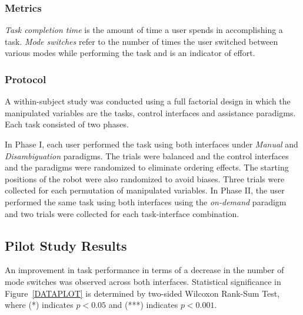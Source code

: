 \documentclass[conference]{IEEEtran}
\begin{document}
\subsubsection*{Metrics}
 \textit{Task completion time} is the amount of time a user spends in accomplishing a task. \textit{Mode switches} refer to the number of times the user switched between various modes while performing the task and is an indicator of effort. 

\subsubsection*{Protocol}
A within-subject study was conducted using a full factorial design in which the manipulated variables are the tasks, control interfaces and assistance paradigms. Each task consisted of two phases. 

In Phase I, each user performed the task using both interfaces under \textit{Manual} and \textit{Disambiguation} paradigms. The trials were balanced and the control interfaces and the paradigms were randomized to eliminate ordering effects. The starting positions of the robot were also randomized to avoid biases. Three trials were collected for each permutation of manipulated variables. 
In Phase II, the user performed the same task using both interfaces using the \textit{on-demand} paradigm and two trials were collected for each task-interface combination.  



\subsection{Pilot Study Results}\label{RES}
An improvement in task performance in terms of a decrease in the number of mode switches was observed across both interfaces. Statistical significance in Figure~\ref{DATAPLOT} is determined by two-sided Wilcoxon Rank-Sum Test, where (*) indicates $p < 0.05$ and (***) indicates $p < 0.001$.
\end{document}
